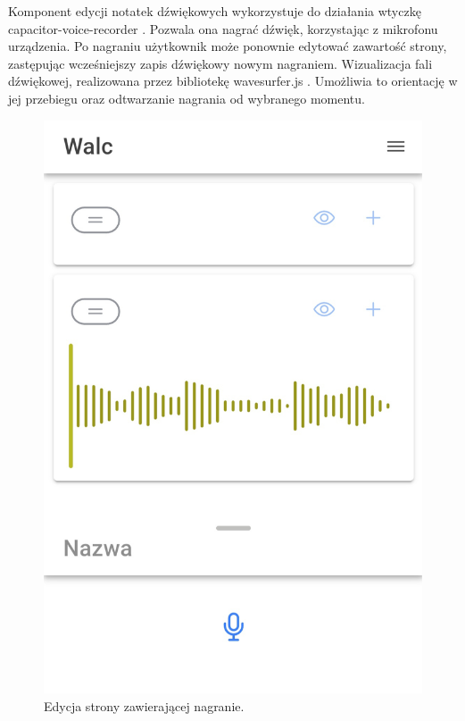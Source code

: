 Komponent edycji notatek dźwiękowych wykorzystuje do działania wtyczkę capacitor-voice-recorder \cite{vr}. Pozwala ona nagrać
dźwięk, korzystając z mikrofonu urządzenia. Po nagraniu użytkownik może ponownie edytować zawartość strony, zastępując
wcześniejszy zapis dźwiękowy nowym nagraniem. Wizualizacja fali dźwiękowej, realizowana przez bibliotekę wavesurfer.js \cite{wavesurfer}.
Umożliwia to orientację w jej przebiegu oraz odtwarzanie nagrania od wybranego momentu.

\begin{figure}[H]
	\begin{center}
		\includegraphics[scale=0.11]{media/AudioEditor.jpg}
	\end{center}
	\caption{Edycja strony zawierającej nagranie.}
	\label{rys:audio-editor}
\end{figure}

